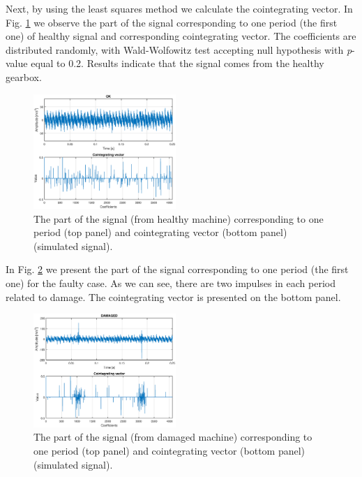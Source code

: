 \documentclass[preprint]{elsarticle}
\begin{document}
	Next, by using the least squares method we calculate the cointegrating vector. In Fig. \ref{fig:simulated_vector_ok} we observe the part of the signal corresponding to one period (the first one) of healthy signal and corresponding cointegrating vector. The coefficients are distributed randomly, with Wald-Wolfowitz test accepting null hypothesis with \emph{p}-value equal to 0.2. Results indicate that the signal comes from the healthy gearbox.   

\begin{figure}[ht!]
\centering
\includegraphics[width=0.48\textwidth]{wykresy/simulated_vector_ok.eps}
\caption{The part of the signal (from healthy machine) corresponding to one  period (top panel) and cointegrating vector (bottom panel)(simulated signal).}
\label{fig:simulated_vector_ok}
\end{figure}

In Fig. \ref{fig:simulated_vector_damaged} we present the part of the signal corresponding to one period (the first one) for the faulty case. As we can see, there are two impulses in each period related to damage. The cointegrating vector is presented on the bottom panel. 

\begin{figure}[ht!]
\centering
\includegraphics[width=0.48\textwidth]{wykresy/simulated_vector_damaged.eps}
\caption{The part of the signal (from damaged machine) corresponding to one  period (top panel) and cointegrating vector (bottom panel)(simulated signal).}
\label{fig:simulated_vector_damaged}
\end{figure}
\end{document}

